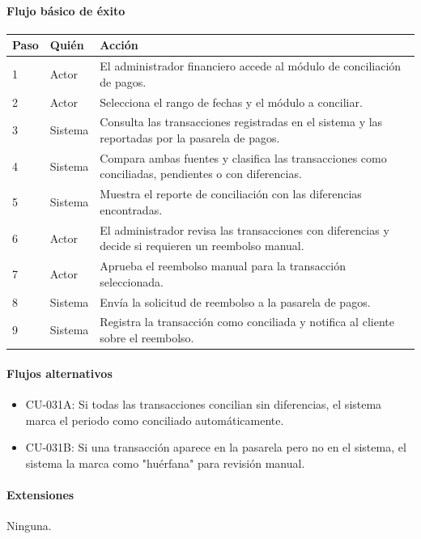 \paragraph{Flujo básico de éxito}
\begin{longtable}{P{1.1cm}P{1.8cm}P{10.5cm}}
\toprule
\textbf{Paso} & \textbf{Quién} & \textbf{Acción}\\
\midrule
{} & Actor & El administrador financiero accede al módulo de conciliación de pagos.\\
2 & Actor & Selecciona el rango de fechas y el módulo a conciliar.\\
3 & Sistema & Consulta las transacciones registradas en el sistema y las reportadas por la pasarela de pagos.\\
4 & Sistema & Compara ambas fuentes y clasifica las transacciones como conciliadas, pendientes o con diferencias.\\
5 & Sistema & Muestra el reporte de conciliación con las diferencias encontradas.\\
6 & Actor & El administrador revisa las transacciones con diferencias y decide si requieren un reembolso manual.\\
7 & Actor & Aprueba el reembolso manual para la transacción seleccionada.\\
8 & Sistema & Envía la solicitud de reembolso a la pasarela de pagos.\\
9 & Sistema & Registra la transacción como conciliada y notifica al cliente sobre el reembolso.\\
\bottomrule
\end{longtable}

\paragraph{Flujos alternativos}
\begin{itemize}[leftmargin=1.4em, topsep=1pt]
  \item CU-031A: Si todas las transacciones concilian sin diferencias, el sistema marca el periodo como conciliado automáticamente.
  \item CU-031B: Si una transacción aparece en la pasarela pero no en el sistema, el sistema la marca como "huérfana" para revisión manual.
\end{itemize}

\paragraph{Extensiones}
Ninguna.

